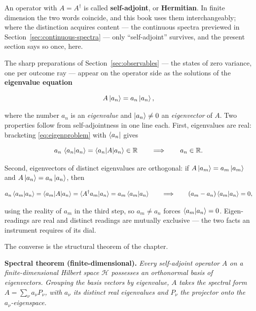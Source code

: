 An operator with $A=A^\dagger$ is called \textbf{self-adjoint}, or \textbf{Hermitian}. In finite dimension the two words coincide, and this book uses them interchangeably; where the distinction acquires content --- the continuous spectra previewed in Section~\ref{sec:continuous-spectra} --- only ``self-adjoint'' survives, and the present section says so once, here.

The sharp preparations of Section~\ref{sec:observables} --- the states of zero variance, one per outcome ray --- appear on the operator side as the solutions of the \textbf{eigenvalue equation}
\begin{linenomath}
\begin{equation}
    A\ket{a_n}=a_n\ket{a_n},
    \label{eq:eigenproblem}
\end{equation}
\end{linenomath}
where the number $a_n$ is an \emph{eigenvalue} and $\ket{a_n}\neq0$ an \emph{eigenvector} of $A$. Two properties follow from self-adjointness in one line each. First, eigenvalues are real: bracketing \eqref{eq:eigenproblem} with $\bra{a_n}$ gives
\begin{linenomath}
\begin{equation}
    a_n\,\braket{a_n|a_n}=\braket{a_n|A|a_n}\in\mathbb{R}
    \qquad\Longrightarrow\qquad
    a_n\in\mathbb{R}.
\end{equation}
\end{linenomath}
Second, eigenvectors of distinct eigenvalues are orthogonal: if $A\ket{a_m}=a_m\ket{a_m}$ and $A\ket{a_n}=a_n\ket{a_n}$, then
\begin{linenomath}
\begin{equation}
    a_n\braket{a_m|a_n}
    =\braket{a_m|A|a_n}
    =\braket{A^\dagger a_m|a_n}
    =a_m\braket{a_m|a_n}
    \qquad\Longrightarrow\qquad
    (a_m-a_n)\braket{a_m|a_n}=0 ,
\end{equation}
\end{linenomath}
using the reality of $a_m$ in the third step, so $a_m\neq a_n$ forces $\braket{a_m|a_n}=0$. Eigen-readings are real and distinct readings are mutually exclusive --- the two facts an instrument requires of its dial.

The converse is the structural theorem of the chapter.

\medskip\noindent\textbf{Spectral theorem (finite-dimensional).} \emph{Every self-adjoint operator $A$ on a finite-dimensional Hilbert space $\mathcal H$ possesses an orthonormal basis of eigenvectors. Grouping the basis vectors by eigenvalue, $A$ takes the spectral form $A=\sum_\nu a_\nu P_\nu$, with $a_\nu$ its distinct real eigenvalues and $P_\nu$ the projector onto the $a_\nu$-eigenspace.}

